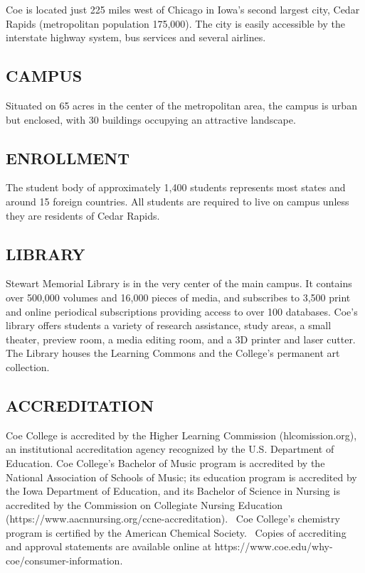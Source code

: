 \documentclass[
  letterpaper,
]{scrbook}
\begin{document}
Coe is located just 225 miles west of Chicago in Iowa's second largest
city, Cedar Rapids (metropolitan population 175,000). The city is easily
accessible by the interstate highway system, bus services and several
airlines.

\subsection{CAMPUS}\label{campus}

Situated on 65 acres in the center of the metropolitan area, the campus
is urban but enclosed, with 30 buildings occupying an attractive
landscape.

\subsection{ENROLLMENT}\label{enrollment}

The student body of approximately 1,400 students represents most states
and around 15 foreign countries. All students are required to live on
campus unless they are residents of Cedar Rapids.

\subsection{LIBRARY}\label{library}

Stewart Memorial Library is in the very center of the main campus. It
contains over 500,000 volumes and 16,000 pieces of media, and subscribes
to 3,500 print and online periodical subscriptions providing access to
over 100 databases. Coe's library offers students a variety of research
assistance, study areas, a small theater, preview room, a media editing
room, and a 3D printer and laser cutter. The Library houses the Learning
Commons and the College's permanent art collection.

\subsection{ACCREDITATION}\label{accreditation}

Coe College is accredited by the Higher Learning Commission
(hlcomission.org), an institutional accreditation agency recognized by
the U.S. Department of Education. Coe College's Bachelor of Music
program is accredited by the National Association of Schools of Music;
its education program is accredited by the Iowa Department of Education,
and its Bachelor of Science in Nursing is accredited by the Commission
on Collegiate Nursing Education
(https://www.aacnnursing.org/ccne-accreditation).~ Coe College's
chemistry program is certified by the American Chemical Society.~ Copies
of accrediting and approval statements are available online at
https://www.coe.edu/why-coe/consumer-information.
\end{document}
